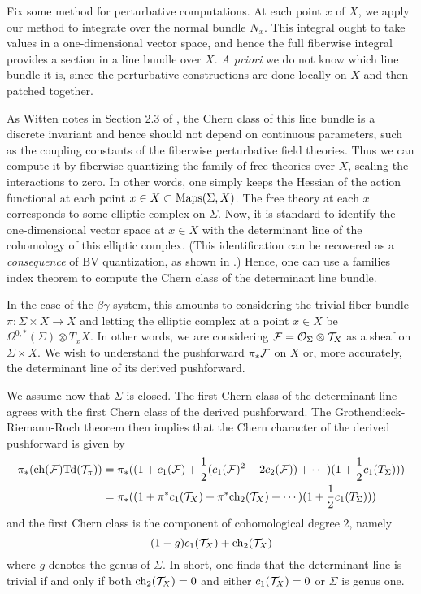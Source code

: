 Fix some method for perturbative computations.
At each point $x$ of $X$, we apply our method to integrate over the normal bundle $N_x$.
This integral ought to take values in a one-dimensional vector space, and 
hence the full fiberwise integral provides a section in a line bundle over $X$.
{\em A priori} we do not know which line bundle it is, 
since the perturbative constructions are done locally on $X$ and then patched together.

As Witten notes in Section 2.3 of \cite{WittenCDO}, the Chern class of this line bundle is a discrete invariant and 
hence should not depend on continuous parameters, 
such as the coupling constants of the fiberwise perturbative field theories.
Thus we can compute it by fiberwise quantizing the family of free theories over $X$,
scaling the interactions to zero.
In other words, one simply keeps the Hessian of the action functional at each point $x \in X \subset {\rm Maps}(\Sigma,X)$.
The free theory at each $x$ corresponds to some elliptic complex on $\Sigma$. 
Now, it is standard to identify the one-dimensional vector space at $x \in X$ with the determinant line of the cohomology of this elliptic complex.
(This identification can be recovered as a {\em consequence} of BV quantization, as shown in \cite{GwHaug}.)
Hence, one can use a families index theorem to compute the Chern class of the determinant line bundle.

In the case of the $\beta\gamma$ system, 
this amounts to considering the trivial fiber bundle $\pi: \Sigma \times X \to X$
and letting the elliptic complex at a point $x \in X$ be $\Omega^{0,*}(\Sigma) \otimes T_x X$.
In other words, we are considering $\mathcal F = \mathcal O_\Sigma \otimes \mathcal T_X$ as a sheaf on $\Sigma \times X$.
We wish to understand the pushforward $\pi_* \mathcal F$ on $X$ or, more accurately, the determinant line of its derived pushforward.

\def\Td{{\rm Td}}

We assume now that $\Sigma$ is closed.
The first Chern class of the determinant line agrees with the first Chern class of the derived pushforward.
The Grothendieck-Riemann-Roch theorem then implies that the Chern character of the derived pushforward 
is given by 
\begin{align*}
\pi_*( \ch(\cF) \Td(\cT_\pi)) &= \pi_*( (1 + c_1(\cF) + \frac{1}{2}(c_1(\cF)^2 - 2c_2(\cF)) + \cdots)(1 +\frac{1}{2}c_1(T_\Sigma)))\\
&= \pi_*( (1 + \pi^* c_1(\cT_X) + \pi^* \ch_2(\cT_X) + \cdots)(1 +\frac{1}{2}c_1(T_\Sigma)))
\end{align*}
and the first Chern class is the component of cohomological degree 2, namely
\[
(1-g) c_1(\mathcal T_X) + {\rm ch}_2(\mathcal T_X) 
\]
where $g$ denotes the genus of $\Sigma$.
In short, one finds that the determinant line is trivial if and only if 
both ${\rm ch}_2(\mathcal T_X) = 0$ and either $c_1(\mathcal T_X) = 0$ or $\Sigma$ is genus one.

